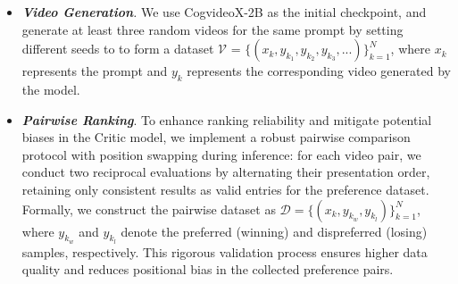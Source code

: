 \begin{itemize}
\setlength{\itemsep}{2pt}
\item \textit{\textbf{Video Generation}.} We use CogvideoX-2B as the initial checkpoint, and generate at least three random videos for the same prompt by setting different seeds to to form a dataset $\mathcal{V}$ = $\{(x_k, y_{k_1}, y_{k_2}, y_{k_3},...)\}_{k=1}^N$,  where $x_k$ represents the prompt and $y_k$ represents the corresponding video generated by the model. 

\item \textit{\textbf{Pairwise Ranking}}.
To enhance ranking reliability and mitigate potential biases in the Critic model, we implement a robust pairwise comparison protocol with position swapping during inference: for each video pair, we conduct two reciprocal evaluations by alternating their presentation order, retaining only consistent results as valid entries for the preference dataset. Formally, we construct the pairwise dataset as $\mathcal{D} = \{(x_k, y_{k_w}, y_{k_l})\}_{k=1}^N$, where $y_{k_w}$ and $y_{k_l}$ denote the preferred (winning) and dispreferred (losing) samples, respectively. This rigorous validation process ensures higher data quality and reduces positional bias in the collected preference pairs.


\end{itemize}

